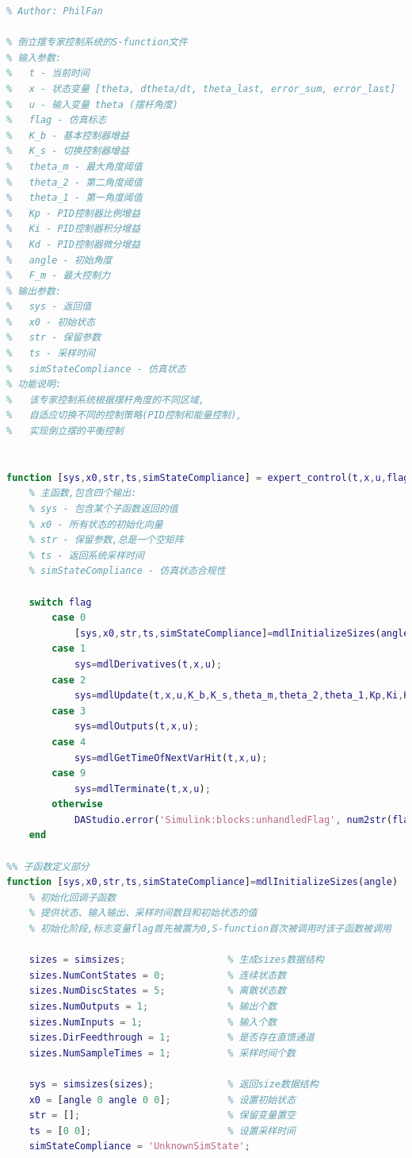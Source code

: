\documentclass[12pt,a4paper,UTF8]{article}
\begin{document}
\begin{lstlisting}[language=Matlab]
% Date: 2024-12-01
% Author: PhilFan 

% 倒立摆专家控制系统的S-function文件
% 输入参数:
%   t - 当前时间
%   x - 状态变量 [theta, dtheta/dt, theta_last, error_sum, error_last]
%   u - 输入变量 theta (摆杆角度)
%   flag - 仿真标志
%   K_b - 基本控制器增益
%   K_s - 切换控制器增益
%   theta_m - 最大角度阈值
%   theta_2 - 第二角度阈值
%   theta_1 - 第一角度阈值
%   Kp - PID控制器比例增益
%   Ki - PID控制器积分增益
%   Kd - PID控制器微分增益
%   angle - 初始角度
%   F_m - 最大控制力
% 输出参数:
%   sys - 返回值
%   x0 - 初始状态
%   str - 保留参数
%   ts - 采样时间
%   simStateCompliance - 仿真状态
% 功能说明:
%   该专家控制系统根据摆杆角度的不同区域,
%   自适应切换不同的控制策略(PID控制和能量控制),
%   实现倒立摆的平衡控制


function [sys,x0,str,ts,simStateCompliance] = expert_control(t,x,u,flag,K_b,K_s,theta_m,theta_2,theta_1,Kp,Ki,Kd,angle,F_m)
    % 主函数,包含四个输出:
    % sys - 包含某个子函数返回的值
    % x0 - 所有状态的初始化向量
    % str - 保留参数,总是一个空矩阵
    % ts - 返回系统采样时间
    % simStateCompliance - 仿真状态合规性
    
    switch flag
        case 0
            [sys,x0,str,ts,simStateCompliance]=mdlInitializeSizes(angle);
        case 1
            sys=mdlDerivatives(t,x,u);
        case 2
            sys=mdlUpdate(t,x,u,K_b,K_s,theta_m,theta_2,theta_1,Kp,Ki,Kd,F_m);
        case 3
            sys=mdlOutputs(t,x,u);
        case 4
            sys=mdlGetTimeOfNextVarHit(t,x,u);
        case 9
            sys=mdlTerminate(t,x,u);
        otherwise
            DAStudio.error('Simulink:blocks:unhandledFlag', num2str(flag));
    end

%% 子函数定义部分
function [sys,x0,str,ts,simStateCompliance]=mdlInitializeSizes(angle)
    % 初始化回调子函数
    % 提供状态、输入输出、采样时间数目和初始状态的值
    % 初始化阶段,标志变量flag首先被置为0,S-function首次被调用时该子函数被调用
    
    sizes = simsizes;                  % 生成sizes数据结构
    sizes.NumContStates = 0;           % 连续状态数
    sizes.NumDiscStates = 5;           % 离散状态数
    sizes.NumOutputs = 1;              % 输出个数
    sizes.NumInputs = 1;               % 输入个数
    sizes.DirFeedthrough = 1;          % 是否存在直馈通道
    sizes.NumSampleTimes = 1;          % 采样时间个数
    
    sys = simsizes(sizes);             % 返回size数据结构
    x0 = [angle 0 angle 0 0];          % 设置初始状态
    str = [];                          % 保留变量置空
    ts = [0 0];                        % 设置采样时间
    simStateCompliance = 'UnknownSimState';


\end{lstlisting}
\end{document}
